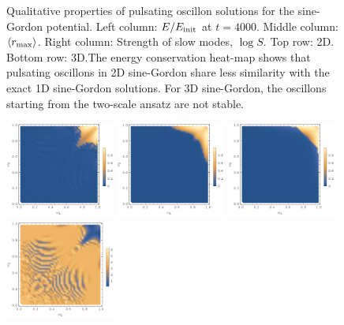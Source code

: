 \documentclass[%
reprint,
superscriptaddress,
amsmath,amssymb,
aps,
prd,
floatfix,
nofootinbib
]{revtex4-1}
\begin{document}
\begin{figure}
  \caption{Qualitative properties of pulsating oscillon solutions for the sine-Gordon potential. Left column: $E/E_{\rm init}$ at $t=4000$.
    Middle column: $\langle r_{\rm max}\rangle$.
    Right column: Strength of slow modes, $\log{S}$.\quad
    Top row: 2D. Bottom row: 3D.\qquad The energy conservation heat-map shows that pulsating oscillons in 2D sine-Gordon share less similarity with the exact 1D sine-Gordon solutions. For 3D sine-Gordon, the oscillons starting from the two-scale ansatz are not stable.}\label{sine2d3d}
\end{figure}

\begin{figure}
    \centering
    \includegraphics[width=0.32\textwidth]{plot/energy-ratio-phi6-1d.png}
    \includegraphics[width=0.32\textwidth]{plot/energy-ratio-phi6-2d.png}
    \includegraphics[width=0.32\textwidth]{plot/energy-ratio-phi6-3d.png} \\
    \includegraphics[width=0.32\textwidth]{plot/r_max-phi6-1d.png}

\end{figure}
\end{document}
